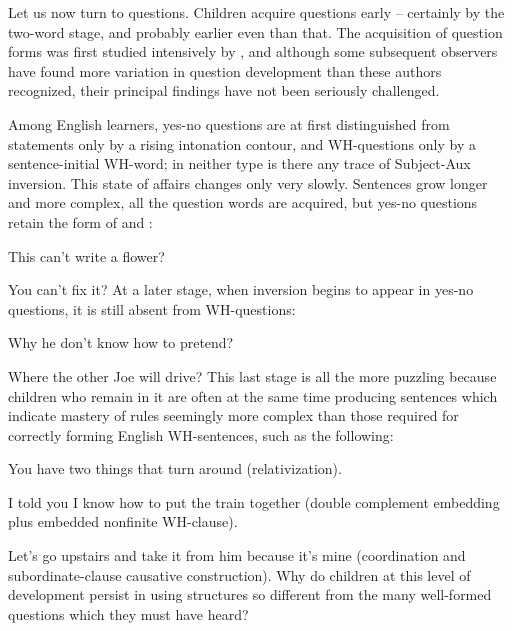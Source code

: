 Let us now turn to questions. Children acquire questions early -- certainly by the two-word stage, and probably earlier even than that. The acquisition of question forms was first studied intensively by \citet{KlimaEtAl1966}, and although some subsequent observers have found more variation in question development than these authors recognized, their principal findings have not been seriously challenged.

Among English learners, yes-no questions are at first distinguished from statements only by a rising intonation contour, and WH-questions only by a sentence-initial WH-word; in neither type is there any trace of Subject-Aux inversion. This state of affairs changes only very slowly. Sentences grow longer and more complex, all the question words are acquired, but yes-no questions retain the form of  and :

\ea\label{ex:3:51}
 This can't write a flower? 
\z

\ea\label{ex:3:52}
 You can't fix it? 
\z
At a later stage, when inversion begins to appear in yes-no questions, it is still absent from WH-questions:

\ea\label{ex:3:53}
 Why he don't know how to pretend? 
\z

\ea\label{ex:3:54}
 Where the other Joe will drive? 
\z
This last stage is all the more puzzling because children who remain in it are often at the same time producing sentences which indicate mastery of rules seemingly more complex than those required for correctly forming English WH-sentences, such as the following:

\ea\label{ex:3:55}
 You have two things that turn around (relativization). 
\z

\ea\label{ex:3:56}
 I told you I know how to put the train together (double complement embedding plus embedded nonfinite WH-clause). 
\z

\ea\label{ex:3:57}
 Let's go upstairs and take it from him because it's mine (coordination and subordinate-clause causative construction). 
\z
Why do children at this level of development persist in using structures so different from the many well-formed questions which they must have heard?

